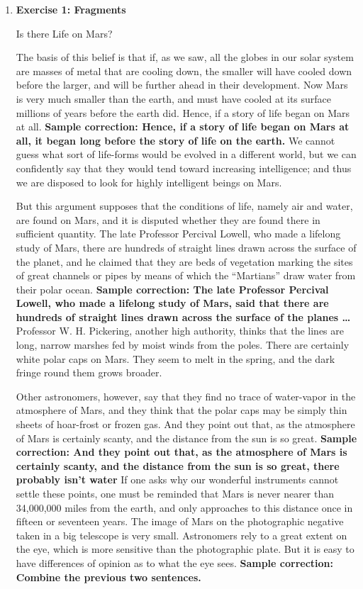 \begin{enumerate}
\item \textbf{Exercise 1: Fragments}

Is there Life on Mars?

The basis of this belief is that if, as we saw, all the globes in our solar system are masses of metal that are cooling down, the smaller will have cooled down before the larger, and will be further ahead in their development. Now Mars is very much smaller than the earth, and must have cooled at its surface millions of years before the earth did. Hence, if a story of life began on Mars at all. \textbf{Sample correction: Hence, if a story of life began on Mars at all, it began long before the story of life on the earth.} We cannot guess what sort of life-forms would be evolved in a different world, but we can confidently say that they would tend toward increasing intelligence; and thus we are disposed to look for highly intelligent beings on Mars.

But this argument supposes that the conditions of life, namely air and water, are found on Mars, and it is disputed whether they are found there in sufficient quantity. The late Professor Percival Lowell, who made a lifelong study of Mars, there are hundreds of straight lines drawn across the surface of the planet, and he claimed that they are beds of vegetation marking the sites of great channels or pipes by means of which the ``Martians'' draw water from their polar ocean. \textbf{Sample correction: The late Professor Percival Lowell, who made a lifelong study of Mars, said that there are hundreds of straight lines drawn across the surface of the planes \ldots} Professor W. H. Pickering, another high authority, thinks that the lines are long, narrow marshes fed by moist winds from the poles. There are certainly white polar caps on Mars. They seem to melt in the spring, and the dark fringe round them grows broader.

Other astronomers, however, say that they find no trace of water-vapor in the atmosphere of Mars, and they think that the polar caps may be simply thin sheets of hoar-frost or frozen gas. And they point out that, as the atmosphere of Mars is certainly scanty, and the distance from the sun is so great. \textbf{Sample correction: And they point out that, as the atmosphere of Mars is certainly scanty, and the distance from the sun is so great, there probably isn't water} If one asks why our wonderful instruments cannot settle these points, one must be reminded that Mars is never nearer than 34,000,000 miles from the earth, and only approaches to this distance once in fifteen or seventeen years. The image of Mars on the photographic negative taken in a big telescope is very small. Astronomers rely to a great extent on the eye, which is more sensitive than the photographic plate. But it is easy to have differences of opinion as to what the eye sees. \textbf{Sample correction: Combine the previous two sentences.}


\end{enumerate}
